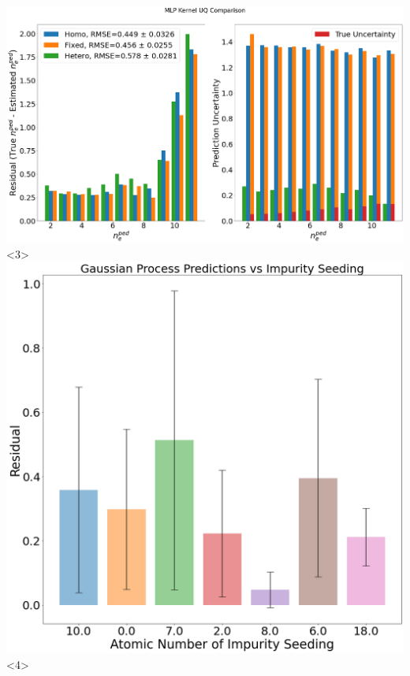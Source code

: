\documentclass{beamer}
\begin{document}
\begin{frame}
\begin{columns}
\includegraphics[scale=0.125]{../src/MLP_UQ_compare}<3>
\includegraphics[scale=0.19]{../src/GP_preds_impurity}<4>
\end{columns}
\end{frame}
\end{document}
